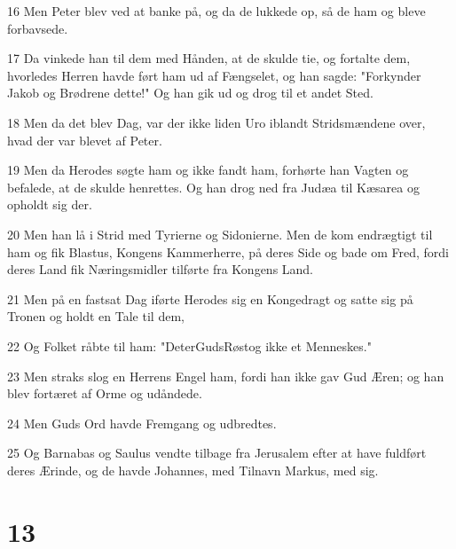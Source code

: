 \par 16 Men Peter blev ved at banke på, og da de lukkede op, så de ham og bleve forbavsede.
\par 17 Da vinkede han til dem med Hånden, at de skulde tie, og fortalte dem, hvorledes Herren havde ført ham ud af Fængselet, og han sagde: "Forkynder Jakob og Brødrene dette!" Og han gik ud og drog til et andet Sted.
\par 18 Men da det blev Dag, var der ikke liden Uro iblandt Stridsmændene over, hvad der var blevet af Peter.
\par 19 Men da Herodes søgte ham og ikke fandt ham, forhørte han Vagten og befalede, at de skulde henrettes. Og han drog ned fra Judæa til Kæsarea og opholdt sig der.
\par 20 Men han lå i Strid med Tyrierne og Sidonierne. Men de kom endrægtigt til ham og fik Blastus, Kongens Kammerherre, på deres Side og bade om Fred, fordi deres Land fik Næringsmidler tilførte fra Kongens Land.
\par 21 Men på en fastsat Dag iførte Herodes sig en Kongedragt og satte sig på Tronen og holdt en Tale til dem,
\par 22 Og Folket råbte til ham: "DeterGudsRøstog ikke et Menneskes."
\par 23 Men straks slog en Herrens Engel ham, fordi han ikke gav Gud Æren; og han blev fortæret af Orme og udåndede.
\par 24 Men Guds Ord havde Fremgang og udbredtes.
\par 25 Og Barnabas og Saulus vendte tilbage fra Jerusalem efter at have fuldført deres Ærinde, og de havde Johannes, med Tilnavn Markus, med sig.

\chapter{13}

